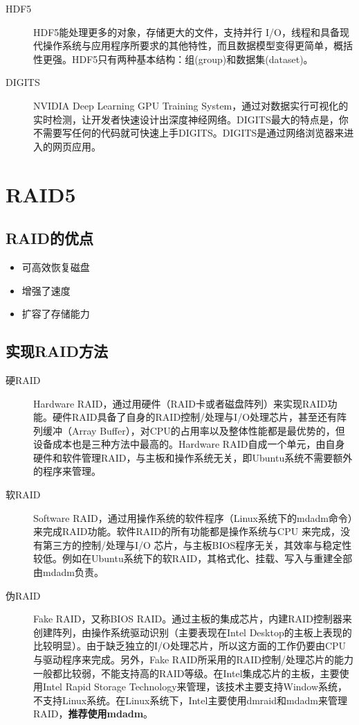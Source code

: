 \begin{description}
\item[HDF5] HDF5能处理更多的对象，存储更大的文件，支持并行 I/O，线程和具备现代操作系统与应用程序所要求的其他特性，而且数据模型变得更简单，概括性更强。HDF5只有两种基本结构：组(group)和数据集(dataset)。

\item[DIGITS] NVIDIA Deep Learning GPU Training System，通过对数据实行可视化的实时检测，让开发者快速设计出深度神经网络。DIGITS最大的特点是，你不需要写任何的代码就可快速上手DIGITS。DIGITS是通过网络浏览器来进入的网页应用。
\end{description}



\section{RAID5}
\subsection{RAID的优点}
\begin{itemize}
\item 可高效恢复磁盘
\item 增强了速度
\item 扩容了存储能力
\end{itemize}

\subsection{实现RAID方法}
\begin{description}
\item[硬RAID] Hardware RAID，通过用硬件（RAID卡或者磁盘阵列）来实现RAID功能。硬件RAID具备了自身的RAID控制/处理与I/O处理芯片，甚至还有阵列缓冲（Array Buffer），对CPU的占用率以及整体性能都是最优势的，但设备成本也是三种方法中最高的。Hardware RAID自成一个单元，由自身硬件和软件管理RAID，与主板和操作系统无关，即Ubuntu系统不需要额外的程序来管理。

\item[软RAID] Software RAID，通过用操作系统的软件程序（Linux系统下的mdadm命令）来完成RAID功能。软件RAID的所有功能都是操作系统与CPU 来完成，没有第三方的控制/处理与I/O 芯片，与主板BIOS程序无关，其效率与稳定性较低。例如在Ubuntu系统下的软RAID，其格式化、挂载、写入与重建全部由mdadm负责。

\item[伪RAID] Fake RAID，又称BIOS RAID。通过主板的集成芯片，内建RAID控制器来创建阵列，由操作系统驱动识别（主要表现在Intel Desktop的主板上表现的比较明显）。由于缺乏独立的I/O处理芯片，所以这方面的工作仍要由CPU与驱动程序来完成。另外，Fake RAID所采用的RAID控制/处理芯片的能力一般都比较弱，不能支持高的RAID等级。在Intel集成芯片的主板，主要使用Intel Rapid Storage Technology来管理，该技术主要支持Window系统，不支持Linux系统。在Linux系统下，Intel主要使用dmraid和mdadm来管理RAID，\textbf{推荐使用mdadm}。
\end{description}

